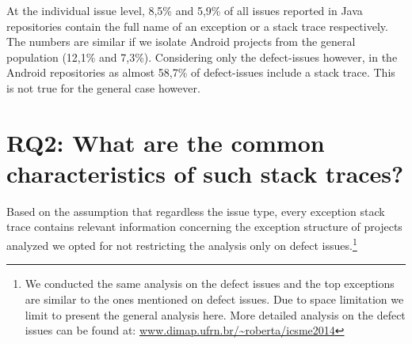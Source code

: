 \documentclass[conference]{IEEEtran}
\begin{document}
At the individual issue level, 8,5\% and 5,9\% of all issues reported in Java
repositories contain the full name of an exception or a stack trace
respectively. The numbers are similar if we isolate Android projects from the
general population (12,1\% and 7,3\%). Considering only the defect-issues
however, in the Android repositories as almost 58,7\% of defect-issues include a
stack trace. This is not true for the general case however.



\section{RQ2: What are the common characteristics of such stack traces?}




Based on the assumption that regardless the issue type, every exception stack
trace contains relevant information concerning the exception structure of
projects analyzed we opted for not restricting the analysis only on defect
issues.\footnote{We conducted the same analysis on the defect issues and the top
exceptions are similar to the ones mentioned on defect issues. Due to space
limitation we limit to present the general analysis here. More detailed analysis
on the defect issues can be found at:
\url{www.dimap.ufrn.br/~roberta/icsme2014}}
\end{document}
